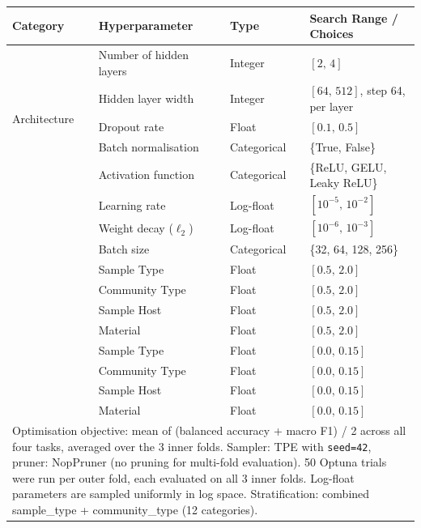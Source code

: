 \centering
\caption{Optuna hyperparameter search space used during nested cross-validation.
TPE (Tree-structured Parzen Estimator) sampler was used with 50 trials per outer fold.
Each trial was evaluated on all 3 inner folds, and the average performance was used for optimization.
All random operations (numpy, PyTorch, TPE sampler, and cross-validation splits) used seed 42.
The final model uses hyperparameters averaged across the 5 outer folds; full values are given in Supplementary Table~4.
\label{tab:optuna_search_space}}
\begin{tabular}{llll}
\toprule
\textbf{Category} & \textbf{Hyperparameter} & \textbf{Type} & \textbf{Search Range / Choices} \\
\midrule
\multirow{5}{*}{Architecture}
  & Number of hidden layers & Integer       & $[2,\, 4]$ \\
  & Hidden layer width       & Integer       & $[64,\, 512]$, step 64, per layer \\
  & Dropout rate             & Float         & $[0.1,\, 0.5]$ \\
  & Batch normalisation      & Categorical   & \{True, False\} \\
  & Activation function      & Categorical   & \{ReLU, GELU, Leaky ReLU\} \\
\addlinespace
\multirow{3}{*}{Optimiser}
  & Learning rate            & Log-float     & $[10^{-5},\, 10^{-2}]$ \\
  & Weight decay ($\ell_2$)  & Log-float     & $[10^{-6},\, 10^{-3}]$ \\
  & Batch size               & Categorical   & \{32, 64, 128, 256\} \\
\addlinespace
\multirow{4}{*}{Task weights ($w_t$)}
  & Sample Type              & Float         & $[0.5,\, 2.0]$ \\
  & Community Type           & Float         & $[0.5,\, 2.0]$ \\
  & Sample Host              & Float         & $[0.5,\, 2.0]$ \\
  & Material                 & Float         & $[0.5,\, 2.0]$ \\
\addlinespace
\multirow{4}{*}{Label smoothing ($\varepsilon_t$)}
  & Sample Type              & Float         & $[0.0,\, 0.15]$ \\
  & Community Type           & Float         & $[0.0,\, 0.15]$ \\
  & Sample Host              & Float         & $[0.0,\, 0.15]$ \\
  & Material                 & Float         & $[0.0,\, 0.15]$ \\
\bottomrule
\multicolumn{4}{p{0.88\linewidth}}{\footnotesize
Optimisation objective: mean of (balanced accuracy + macro F1) / 2 across all four tasks, averaged over the 3 inner folds.
Sampler: TPE \cite{optuna_2019} with \texttt{seed=42}, pruner: NopPruner (no pruning for multi-fold evaluation).
50 Optuna trials were run per outer fold, each evaluated on all 3 inner folds.
Log-float parameters are sampled uniformly in log space. Stratification: combined sample\_type + community\_type (12 categories).}
\end{tabular}
